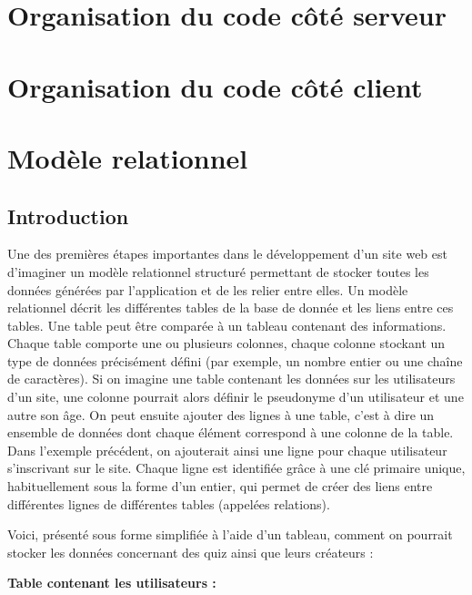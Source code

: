 \documentclass[letterpaper,10pt,french]{sphinxmanual}
\begin{document}
\chapter{Organisation du code côté serveur}
\label{code-backend:organisation-du-code-cote-serveur}\label{code-backend::doc}

\chapter{Organisation du code côté client}
\label{code-frontend:organisation-du-code-cote-client}\label{code-frontend::doc}

\chapter{Modèle relationnel}
\label{database:modele-relationnel}\label{database::doc}

\section{Introduction}
\label{database:introduction}
Une des premières étapes importantes dans le développement d'un site web est d'imaginer un modèle relationnel structuré permettant de stocker toutes les données générées par l'application et de les relier entre elles. Un modèle relationnel décrit les différentes tables de la base de donnée et les liens entre ces tables. Une table peut être comparée à un tableau contenant des informations. Chaque table comporte une ou plusieurs colonnes, chaque colonne stockant un type de données précisément défini (par exemple, un nombre entier ou une chaîne de caractères). Si on imagine une table contenant les données sur les utilisateurs d'un site, une colonne pourrait alors définir le pseudonyme d'un utilisateur et une autre son âge. On peut ensuite ajouter des lignes à une table, c'est à dire un ensemble de données dont chaque élément correspond à une colonne de la table. Dans l'exemple précédent, on ajouterait ainsi une ligne pour chaque utilisateur s'inscrivant sur le site. Chaque ligne est identifiée grâce à une clé primaire unique, habituellement sous la forme d'un entier, qui permet de créer des liens entre différentes lignes de différentes tables (appelées relations).

Voici, présenté sous forme simplifiée à l'aide d'un tableau, comment on pourrait stocker les données concernant des quiz ainsi que leurs créateurs :

\textbf{Table contenant les utilisateurs :}
\end{document}

